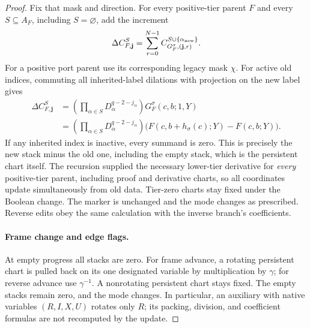 \begin{proof}
Fix that mask and direction.  For every positive-tier parent $F$
and every $S\subseteq A_F$, including $S=\varnothing$, add the
increment
\begin{equation}
 \Delta C^S_{F,\mathbf j}
    =\sum_{r=0}^{N-1}
      C^{S\cup\{\alpha_{\rm new}\}}_{G_F^\sigma,(\mathbf j,r)}.
                                                               \label{ia:edit-increment}
\end{equation}
For a positive port parent use its corresponding legacy mask
$\chi$.  For active old indices, commuting all inherited-label
dilations with projection on the new label gives
\begin{align}
 \Delta C^S_{F,\mathbf j}
   &=\left(\prod_{\alpha\in S}D_\alpha^{q-2-j_\alpha}\right)
          G_F^\sigma(c,b;1,Y)                    \label{ia:edit-calculation}\\
   &=\left(\prod_{\alpha\in S}D_\alpha^{q-2-j_\alpha}\right)
          \bigl(F(c,b+h_\sigma(c);Y)-F(c,b;Y)\bigr).
                                                        \nonumber
\end{align}
If any inherited index is inactive, every summand is zero.  This
is precisely the new stack minus the old one, including the empty
stack, which is the persistent chart itself.  The recursion supplied
the necessary lower-tier derivative for \emph{every} positive-tier
parent, including proof and derivative charts, so all coordinates
update simultaneously from old data.  Tier-zero charts stay fixed
under the Boolean change.  The marker is unchanged and the mode
changes as prescribed.  Reverse edits obey the same calculation
with the inverse branch's coefficients.

\paragraph{Frame change and edge flags.}
At empty progress all stacks are zero.  For frame advance, a
rotating persistent chart is pulled back on its one designated
variable by multiplication by $\gamma$; for reverse advance use
$\gamma^{-1}$.  A nonrotating persistent chart stays fixed.  The
empty stacks remain zero, and the mode changes.  In particular,
an auxiliary with native variables $(R,I,X,U)$ rotates only $R$;
its packing, division, and coefficient formulas are not recomputed
by the update.


\end{proof}
